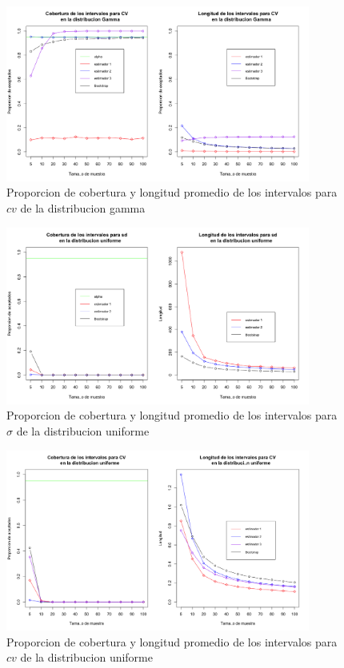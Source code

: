 \documentclass[letterpaper,12pt,onecolumn,titlepage]{article}
\begin{document}
\begin{figure}[!h]
    \begin{center}
        \includegraphics[width=10cm]{Figuras/Rplot03.png}
        \caption{Proporcion de cobertura y longitud promedio de los intervalos para $cv$ de la distribucion gamma}
        \label{fig:Densidad}
    \end{center}
\end{figure}

\begin{figure}[!h]
    \begin{center}
        \includegraphics[width=10cm]{Figuras/Rplot04.png}
        \caption{Proporcion de cobertura y longitud promedio de los intervalos para $\sigma$ de la distribucion uniforme}
        \label{fig:Densidad}
    \end{center}
\end{figure}

\begin{figure}[!h]
    \begin{center}
        \includegraphics[width=10cm]{Figuras/Rplot05.png}
        \caption{Proporcion de cobertura y longitud promedio de los intervalos para $cv$ de la distribucion uniforme}
        \label{fig:Densidad}
    \end{center}
\end{figure}


\end{document}
